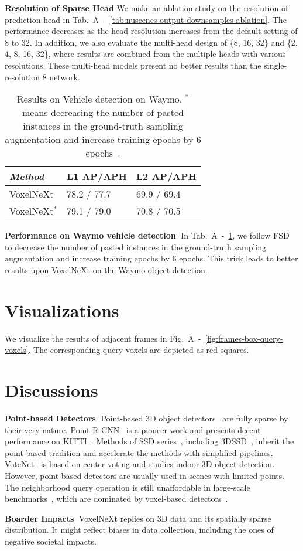 \documentclass[10pt,twocolumn,letterpaper]{article}
\begin{document}
\vspace{0.5em}
\noindent
\textbf{Resolution of Sparse Head}
We make an ablation study on the resolution of prediction head in Tab.~A~-~\ref{tab:nuscenes-output-downsamples-ablation}. The performance decreases as the head resolution increases from the default setting of 8 to 32. In addition, we also evaluate the multi-head design of \{8, 16, 32\} and \{2, 4, 8, 16, 32\}, where results are combined from the multiple heads with various resolutions. These multi-head models present no better results than the single-resolution 8 network.

\begin{table}[t]
\begin{center}
\caption{Results on Vehicle detection on Waymo. $^*$ means decreasing the number of pasted instances in the ground-truth sampling augmentation and increase training epochs by 6 epochs~\cite{fsd}.}
\begin{tabular}{|l|ll|}
\hline
 {\em Method} & L1 AP/APH           & L2  AP/APH          \\ \hline 
VoxelNeXt    &  78.2 / 77.7     & 69.9 / 69.4  \\ 
VoxelNeXt$^*$    &   79.1 / 79.0 &  70.8 / 70.5 \\ \hline
\end{tabular}\label{tab:waymo-vehicle}
\end{center}
\end{table}

\vspace{0.5em}
\noindent
\textbf{Performance on Waymo vehicle detection}$\;$
In Tab.~A~-~\ref{tab:waymo-vehicle}, we follow FSD~\cite{fsd} to decrease the number of pasted instances in the ground-truth sampling augmentation and increase training epochs by 6 epochs. This trick leads to better results upon VoxelNeXt on the Waymo object detection.

\section{Visualizations}
\label{sec:visualizations}
We visualize the results of adjacent frames in Fig.~A~-~\ref{fig:frames-box-query-voxels}. The corresponding query voxels are depicted as red squares. 


\section{Discussions}
\label{sec:discussion}
\noindent
\textbf{Point-based Detectors}$\;$
Point-based 3D object detectors~\cite{votenet,point-rcnn,3dssd,ia-ssd} are fully sparse by their very nature. Point R-CNN~\cite{point-rcnn} is a pioneer work and presents decent performance on KITTI~\cite{kitti}. Methods of SSD series~\cite{3dssd}, including 3DSSD~\cite{3dssd,ia-ssd}, inherit the point-based tradition and accelerate the methods with simplified pipelines. VoteNet~\cite{votenet} is based on center voting and studies indoor 3D object detection. However, point-based detectors are usually used in scenes with limited points. The neighborhood query operation is still unaffordable in large-scale benchmarks~\cite{nuscenes,waymo}, which are dominated by voxel-based detectors~\cite{pvrcnn,centerpoint}.


\vspace{0.5em}
\noindent
\textbf{Boarder Impacts}$\;$
VoxelNeXt replies on 3D data and its spatially sparse distribution. It might reflect biases in data collection, including the ones of negative societal impacts.
\end{document}
